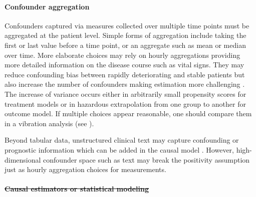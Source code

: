\documentclass[10pt,letterpaper]{article}
\providecommand{\DIFdeltex}[1]{{\protect\color{red}\sout{#1}}}                      %
\providecommand{\DIFdelbegin}{} %
\providecommand{\DIFdel}[1]{\texorpdfstring{\DIFdeltex{#1}}{}} %
\newcommand{\DIFscaledelfig}{0.5}
\newlength{\DIFdelgraphicswidth} %
\newlength{\DIFdelgraphicsheight} %
\newcommand{\DIFdelincludegraphics}[2][]{%
\sbox{\DIFdelgraphicsbox}{\DIFOincludegraphics[#1]{#2}}%
\settoboxwidth{\DIFdelgraphicswidth}{\DIFdelgraphicsbox} %
\settoboxtotalheight{\DIFdelgraphicsheight}{\DIFdelgraphicsbox} %
\scalebox{\DIFscaledelfig}{%
\parbox[b]{\DIFdelgraphicswidth}{\usebox{\DIFdelgraphicsbox}\\[-\baselineskip] \rule{\DIFdelgraphicswidth}{0em}}\llap{\resizebox{\DIFdelgraphicswidth}{\DIFdelgraphicsheight}{%
\setlength{\unitlength}{\DIFdelgraphicswidth}%
\begin{picture}(1,1)%
\thicklines\linethickness{2pt} %
{\color[rgb]{1,0,0}\put(0,0){\framebox(1,1){}}}%
{\color[rgb]{1,0,0}\put(0,0){\line( 1,1){1}}}%
{\color[rgb]{1,0,0}\put(0,1){\line(1,-1){1}}}%
\end{picture}%
}\hspace*{3pt}}} %
} %
\DeclareRobustCommand{\DIFdelbegin}{\DIFOdelbegin \let\includegraphics\DIFdelincludegraphics} %
\begin{document}
%

\paragraph{Confounder aggregation}
Confounders captured via measures collected over multiple time points must be
aggregated at the patient level. Simple forms of aggregation include taking the
first or last value before a time point, or an aggregate such as mean or median
over time. More elaborate choices may rely on hourly aggregations providing more
detailed information on the disease course such as vital signs. They may reduce
confounding bias between rapidly deteriorating and stable patients but also
increase the number of confounders making estimation more challenging
\cite{damour2020overlap}. The increase of variance occurs either in
arbitrarily small propensity scores for treatment models or in hazardous
extrapolation from one group to another for outcome model. If multiple
choices appear reasonable, one should compare them in a vibration analysis
(see ).

Beyond tabular data, unstructured clinical text may capture confounding or
prognostic information \cite{horng2017creating,jiang2023health} which can be
added in the causal model \cite{zeng2022uncovering}.
However, high-dimensional
confounder space such as text may break the positivity assumption just as hourly
aggregation choices for measurements.

\DIFdelbegin \paragraph{\DIFdel{Causal estimators or statistical modeling}}
\addtocounter{paragraph}{-1}%
\end{document}
